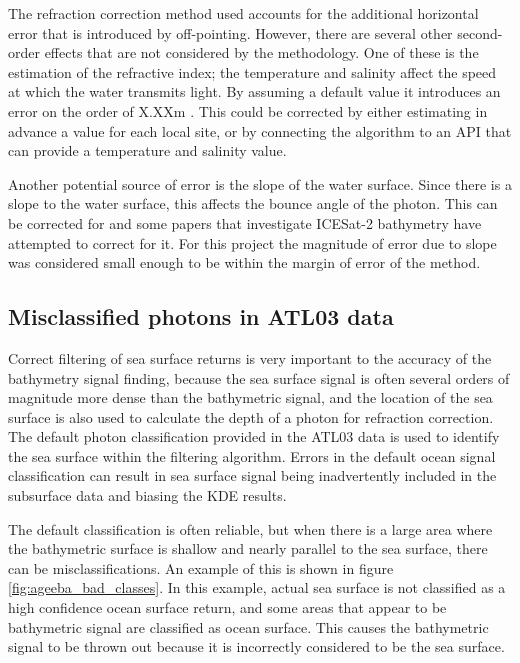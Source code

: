 The refraction correction method used accounts for the additional horizontal error that is introduced by off-pointing. However, there are several other second-order effects that are not considered by the methodology. One of these is the estimation of the refractive index; the temperature and salinity affect the speed at which the water transmits light. By assuming a default value it introduces an error on the order of X.XXm . This could be corrected by either estimating in advance a value for each local site, or by connecting the algorithm to an API that can provide a temperature and salinity value. 

Another potential source of error is the slope of the water surface. Since there is a slope to the water surface, this affects the bounce angle of the photon. This can be corrected for and some papers that investigate ICESat-2 bathymetry have attempted to correct for it. For this project the magnitude of error due to slope was considered small enough to be within the margin of error of the method.

\subsection{Misclassified photons in ATL03 data}

Correct filtering of sea surface returns is very important to the accuracy of the bathymetry signal finding, because the sea surface signal is often several orders of magnitude more dense than the bathymetric signal, and the location of the sea surface is also used to calculate the depth of a photon for refraction correction. The default photon classification provided in the ATL03 data is used to identify the sea surface within the filtering algorithm. Errors in the default ocean signal classification can result in sea surface signal being inadvertently included in the subsurface data and biasing the KDE results.

The default classification is often reliable, but when there is a large area where the bathymetric surface is shallow and nearly parallel to the sea surface, there can be misclassifications. An example of this is shown in figure \ref{fig:ageeba_bad_classes}. In this example, actual sea surface is not classified as a high confidence ocean surface return, and some areas that appear to be bathymetric signal are classified as ocean surface. This causes the bathymetric signal to be thrown out because it is incorrectly considered to be the sea surface.

